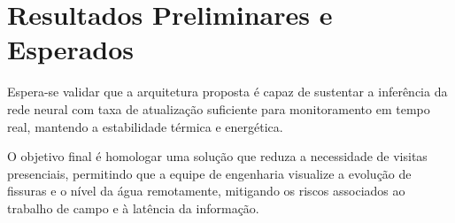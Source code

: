 \chapter{Resultados Preliminares e Esperados}
\label{cap:cap5}

Espera-se validar que a arquitetura proposta é capaz de sustentar a inferência da rede neural com taxa de atualização suficiente para monitoramento em tempo real, mantendo a estabilidade térmica e energética. 

O objetivo final é homologar uma solução que reduza a necessidade de visitas presenciais, permitindo que a equipe de engenharia visualize a evolução de fissuras e o nível da água remotamente, mitigando os riscos associados ao trabalho de campo e à latência da informação.
